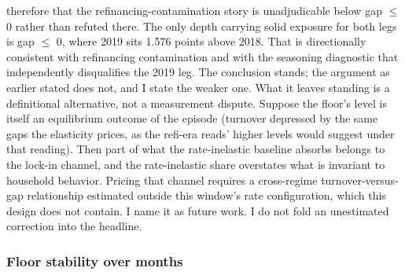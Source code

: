 \documentclass[12pt]{article}
\begin{document}
therefore that the refinancing-contamination story is unadjudicable below gap $\leq$ 0 rather than refuted there. The only depth carrying solid exposure for both legs is gap $\leq$ 0, where 2019 sits 1.576 points above 2018. That is directionally consistent with refinancing contamination and with the seasoning diagnostic that independently disqualifies the 2019 leg. The conclusion stands; the argument as earlier stated does not, and I state the weaker one. What it leaves standing is a definitional alternative, not a measurement dispute. Suppose the floor's level is itself an equilibrium outcome of the episode (turnover depressed by the same gaps the elasticity prices, as the refi-era reads' higher levels would suggest under that reading). Then part of what the rate-inelastic baseline absorbs belongs to the lock-in channel, and the rate-inelastic share overstates what is invariant to household behavior. Pricing that channel requires a cross-regime turnover-versus-gap relationship estimated outside this window's rate configuration, which this design does not contain. I name it as future work. I do not fold an unestimated correction into the headline.

\subsubsection{Floor stability over months}
\end{document}
